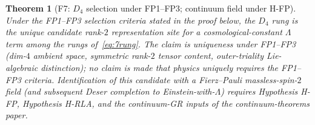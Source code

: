 \documentclass[12pt]{article}
\newtheorem{theorem}{Theorem}
\theoremstyle{definition}
\theoremstyle{remark}
\begin{document}
\begin{theorem}[F7: $D_4$ selection under FP1--FP3; continuum field under H-FP]\label{thm:F7}
Under the FP1--FP3 selection criteria stated in the proof below, the $D_4$ rung is the unique candidate rank-$2$ representation site for a cosmological-constant $\Lambda$ term among the rungs of~\eqref{eq:7rung}. The claim is uniqueness \emph{under FP1--FP3} (dim-$4$ ambient space, symmetric rank-$2$ tensor content, outer-triality Lie-algebraic distinction); no claim is made that physics uniquely requires the FP1--FP3 criteria. Identification of this candidate with a Fierz--Pauli massless-spin-$2$ field (and subsequent Deser completion to Einstein-with-$\Lambda$) requires Hypothesis H-FP, Hypothesis H-RLA, and the continuum-GR inputs of the continuum-theorems paper.
\end{theorem}
\end{document}
